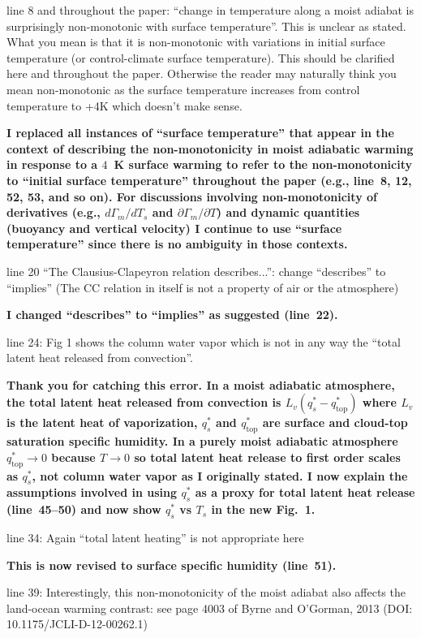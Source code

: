 \documentclass{article}
\begin{document}
line 8 and throughout the paper: ``change in temperature along a moist adiabat is surprisingly non-monotonic with surface temperature''. This is unclear as stated. What you mean is that it is non-monotonic with variations in initial surface temperature (or control-climate surface temperature). This should be clarified here and throughout the paper. Otherwise the reader may naturally think you mean non-monotonic as the surface temperature increases from control temperature to +4K which doesn't make sense.
\par
\textbf{I replaced all instances of ``surface temperature'' that appear in the context of describing the non-monotonicity in moist adiabatic warming in response to a $4$~K surface warming to refer to the non-monotonicity to ``initial surface temperature'' throughout the paper (e.g., line~8, 12, 52, 53, and so on). For discussions involving non-monotonicity of derivatives (e.g., $d\Gamma_m/dT_s$ and $\partial\Gamma_m/\partial T$) and dynamic quantities (buoyancy and vertical velocity) I continue to use ``surface temperature'' since there is no ambiguity in those contexts.}
\par
line 20 ``The Clausius-Clapeyron relation describes...'':  change ``describes'' to ``implies'' (The CC relation in itself is not a property of air or the atmosphere)
\par
\textbf{I changed ``describes'' to ``implies'' as suggested (line~22).}
\par
line 24: Fig 1 shows the column water vapor which is not in any way the ``total latent heat released from convection''.
\par
\textbf{Thank you for catching this error. In a moist adiabatic atmosphere, the total latent heat released from convection is $L_v(q_s^*-q_\mathrm{top}^*)$ where $L_v$ is the latent heat of vaporization, $q_s^*$ and $q_\mathrm{top}^*$ are surface and cloud-top saturation specific humidity. In a purely moist adiabatic atmosphere $q_\mathrm{top}^*\to 0$ because $T\to0$ so total latent heat release to first order scales as $q_s^*$, not column water vapor as I originally stated. I now explain the assumptions involved in using $q_s^*$ as a proxy for total latent heat release (line~45--50) and now show $q_s^*$ vs $T_s$ in the new Fig.~1.}
\par
line 34: Again ``total latent heating'' is not appropriate here
\par
\textbf{This is now revised to surface specific humidity (line~51).}
\par
line 39: Interestingly, this non-monotonicity of the moist adiabat also affects the land-ocean warming contrast: see page 4003 of Byrne and O'Gorman, 2013 (DOI: 10.1175/JCLI-D-12-00262.1)
\end{document}

